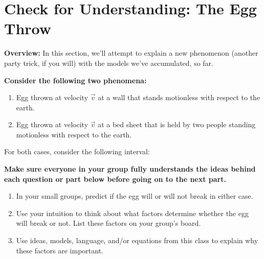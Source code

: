 \section{Check for Understanding: The Egg Throw}

\begin{overview}

	\textbf{Overview:} In this section, we'll attempt to explain a new phenomenon (another party trick, if you will) with the models we've accumulated, so far.
	
\end{overview}

\textbf{Consider the following two phenomena:}

\begin{enumerate}
	\item Egg thrown at velocity $\vec{v}$ at a wall that stands motionless with respect to the earth.
	
	\item Egg thrown at velocity $\vec{v}$ at a bed sheet that is held by two people standing motionless with respect to the earth.
\end{enumerate}

\noindent For both cases, consider the following interval:

\begin{center}
\end{center}

\noindent\textbf{Make sure everyone in your group fully understands the ideas behind each question or part below before going on to the next part.}

\begin{enumerate}
	\item In your small groups, predict if the egg will or will not break in either case.
	\item Use your intuition to think about what factors determine whether the egg will break or not. List these factors on your group's board.
	\item Use ideas, models, language, and/or equations from this class to explain why these factors are important. 
	
\WCD
\end{enumerate}

